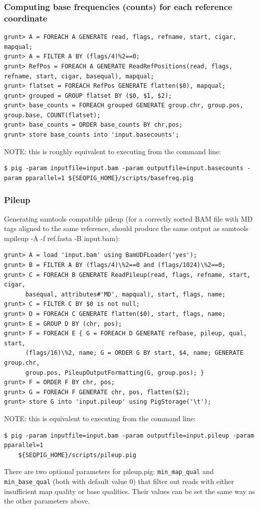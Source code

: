  \subsubsection{Computing base frequencies (counts) for each reference coordinate}
\begin{lstlisting}
grunt> A = FOREACH A GENERATE read, flags, refname, start, cigar, mapqual;
grunt> A = FILTER A BY (flags/4)%2==0;
grunt> RefPos = FOREACH A GENERATE ReadRefPositions(read, flags, refname, start, cigar, basequal), mapqual;
grunt> flatset = FOREACH RefPos GENERATE flatten($0), mapqual;
grunt> grouped = GROUP flatset BY ($0, $1, $2);
grunt> base_counts = FOREACH grouped GENERATE group.chr, group.pos, group.base, COUNT(flatset);
grunt> base_counts = ORDER base_counts BY chr,pos;
grunt> store base_counts into 'input.basecounts';
\end{lstlisting}
NOTE: this is roughly equivalent to executing from the command line:
\begin{lstlisting}
$ pig -param inputfile=input.bam -param outputfile=input.basecounts -param pparallel=1 ${SEQPIG_HOME}/scripts/basefreq.pig 
\end{lstlisting}

\subsubsection{Pileup}
Generating samtools compatible pileup (for a correctly sorted BAM file
with MD tags aligned to the same reference, should produce the same output as
samtools mpileup -A -f ref.fasta -B input.bam):
\begin{lstlisting}
grunt> A = load 'input.bam' using BamUDFLoader('yes');
grunt> B = FILTER A BY (flags/4)\%2==0 and (flags/1024)\%2==0;
grunt> C = FOREACH B GENERATE ReadPileup(read, flags, refname, start, cigar,
      basequal, attributes#'MD', mapqual), start, flags, name;
grunt> C = FILTER C BY $0 is not null;
grunt> D = FOREACH C GENERATE flatten($0), start, flags, name;
grunt> E = GROUP D BY (chr, pos);
grunt> F = FOREACH E { G = FOREACH D GENERATE refbase, pileup, qual, start,
      (flags/16)\%2, name; G = ORDER G BY start, $4, name; GENERATE group.chr,
      group.pos, PileupOutputFormatting(G, group.pos); }
grunt> F = ORDER F BY chr, pos;
grunt> G = FOREACH F GENERATE chr, pos, flatten($2);
grunt> store G into 'input.pileup' using PigStorage('\t');
\end{lstlisting}
NOTE: this is equivalent to executing from the command line:
\begin{lstlisting}
$ pig -param inputfile=input.bam -param outputfile=input.pileup -param pparallel=1
    ${SEQPIG_HOME}/scripts/pileup.pig
\end{lstlisting}
There are two optional parameters for pileup.pig: {\tt min\_map\_qual} and
{\tt min\_base\_qual} (both with default value 0) that filter out reads with
either insufficient map quality or base qualities. Their values can
be set the same way as the other parameters above.

